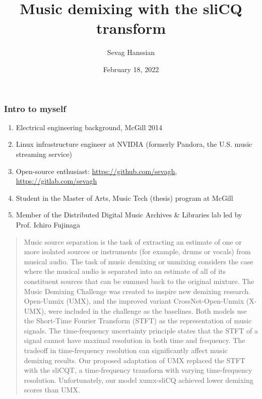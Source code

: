 \documentclass[usenames,dvipsnames]{beamer}
\title{Music demixing with the sliCQ transform}
\author{Sevag Hanssian}
\date{February 18, 2022}
\begin{document}
\begin{frame}
\maketitle
\end{frame}

\begin{frame}
	\frametitle{Intro to myself}
	\begin{enumerate}
		\item
			Electrical engineering background, McGill 2014
		\item
			Linux infrastructure engineer at NVIDIA (formerly Pandora, the U.S. music streaming service)
		\item
			Open-source enthusiast: \url{https://github.com/sevagh}, \url{https://gitlab.com/sevagh}
		\item
			Student in the Master of Arts, Music Tech (thesis) program at McGill
		\item
			Member of the Distributed Digital Music Archives \& Libraries lab led by Prof. Ichiro Fujinaga
	\end{enumerate}
\end{frame}

\begin{frame}
	\begin{quote}
	Music source separation is the task of extracting an estimate of one or more isolated sources or instruments (for example, drums or vocals) from musical audio. The task of music demixing or unmixing considers the case where the musical audio is separated into an estimate of all of its constituent sources that can be summed back to the original mixture. The Music Demixing Challenge was created to inspire new demixing research. Open-Unmix (UMX), and the improved variant CrossNet-Open-Unmix (X-UMX), were included in the challenge as the baselines. Both models use the Short-Time Fourier Transform (STFT) as the representation of music signals. The time-frequency uncertainty principle states that the STFT of a signal cannot have maximal resolution in both time and frequency. The tradeoff in time-frequency resolution can significantly affect music demixing results. Our proposed adaptation of UMX replaced the STFT with the sliCQT, a time-frequency transform with varying time-frequency resolution. Unfortunately, our model xumx-sliCQ achieved lower demixing scores than UMX.
	\end{quote}
\end{frame}
\end{document}
